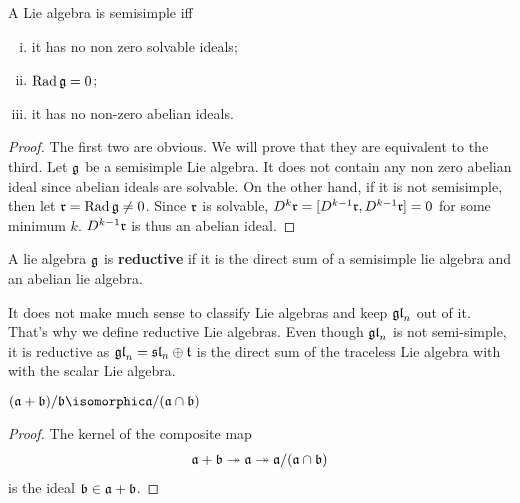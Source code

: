 \begin{lemma}
    \label{lemma:semisimple_definitions}
    A Lie algebra is semisimple iff 
    \begin{enumerate}[(i)]
        \makethislistcompact
        \item it has no non zero solvable ideals;
        \item $\operatorname{Rad} \mathfrak{g}=0$;
        \item it has no non-zero abelian ideals.
    \end{enumerate}
\end{lemma}
\begin{proof}
    The first two are obvious. We will prove that they are equivalent to the third.
    Let $\mathfrak{g}$ be a semisimple Lie algebra. It does not contain any non zero abelian ideal since abelian ideals are solvable. On the other hand, if it is not semisimple, then let $\Lie r = \Rad \Lie g \neq 0$. Since $\Lie r$ is solvable, $D^k\Lie r = [D^{k-1}\Lie r, D^{k-1}\Lie r]=0$ for some minimum $k$. $D^{k-1}\Lie r$ is thus an abelian ideal.

\end{proof}

\begin{definition}[Reductive]
    A lie algebra $\mathfrak{g}$ is \textbf{reductive} if it is the direct sum of a semisimple lie algebra and an abelian lie algebra.
\end{definition}
\begin{insight}
   It does not make much sense to classify Lie algebras and keep $\Lie{gl}_n$ out of it. That's why we define reductive Lie algebras. Even though $\Lie{gl}_n$ is not semi-simple, it is reductive as $\Lie{gl}_n = \Lie{sl}_n\oplus \Lie{t}$ is the direct sum of the traceless Lie algebra with with the scalar Lie algebra.
\end{insight}

\begin{lemma}
    $ (\mathfrak{a} + \mathfrak{b})/\mathfrak{b} \isomorphic \mathfrak a / (\mathfrak a \cap \mathfrak b) $
\end{lemma}
\begin{proof} The kernel of the composite map 
   \begin{align}
       \mathfrak{a} + \mathfrak{b} \twoheadrightarrow \mathfrak{a} \twoheadrightarrow \mathfrak{a}/(\mathfrak{a} \cap \mathfrak{b})
   \end{align} 
   is the ideal $\mathfrak{b} \in \mathfrak{a} + \mathfrak{b}$.
\end{proof}


